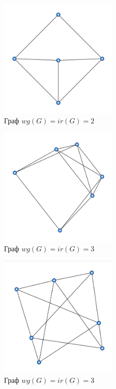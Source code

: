 \documentclass[bachelor, och, nir]{SCWorks}
\begin{document}
\begin{figure}[ht!]  
    \centering 
    \includegraphics[width=0.5\textwidth]
{55.jpg}  
    \caption{Граф $wg(G) = ir(G) = 2$} 
    \label{fig:im3} 
\end{figure}

\begin{figure}[ht!]  
    \centering 
    \includegraphics[width=0.5\textwidth]
{66.jpg}  
    \caption{Граф $wg(G) = ir(G) = 3$} 
    \label{fig:im3} 
\end{figure}

\begin{figure}[ht!]  
    \centering 
    \includegraphics[width=0.5\textwidth]
{77.jpg}  
    \caption{Граф $wg(G) = ir(G) = 3$} 
    \label{fig:im3} 
\end{figure}
\end{document}
